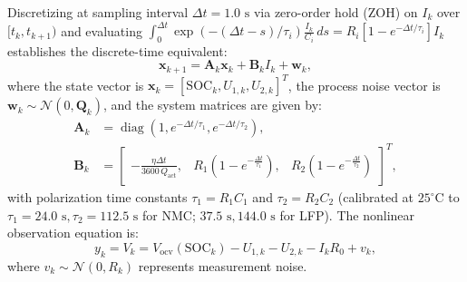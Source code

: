 \documentclass[balance,nocopyright,upint,varvw,hyphenate,barcolor=NavyBlue,nolists]{asmejour}
\begin{document}
Discretizing at sampling interval $\Delta t = 1.0\text{ s}$ via zero-order hold (ZOH) on $I_k$ over $[t_k, t_{k+1})$ and evaluating $\int_0^{\Delta t} \exp(-(\Delta t - s)/\tau_i) \frac{I_k}{C_i}\,ds = R_i [1 - e^{-\Delta t/\tau_i}] I_k$ establishes the discrete-time equivalent:
\begin{equation}\label{eqn:state_space_discrete}
\mathbf{x}_{k+1} = \mathbf{A}_k \mathbf{x}_k + \mathbf{B}_k I_k + \mathbf{w}_k,
\end{equation}
where the state vector is $\mathbf{x}_k = [\text{SOC}_k, U_{1,k}, U_{2,k}]^T$, the process noise vector is $\mathbf{w}_k \sim \mathcal{N}(0, \mathbf{Q}_k)$, and the system matrices are given by:
\begin{align}
\mathbf{A}_k &= \operatorname{diag}\left(1, e^{-\Delta t/\tau_1}, e^{-\Delta t/\tau_2}\right), \label{eqn:Ak_mat} \\
\mathbf{B}_k &= \begin{bmatrix}
-\frac{\eta \Delta t}{3600\,Q_{\text{act}}}, & R_1\left(1 - e^{-\frac{\Delta t}{\tau_1}}\right), & R_2\left(1 - e^{-\frac{\Delta t}{\tau_2}}\right)
\end{bmatrix}^T, \label{eqn:Bk_mat}
\end{align}
with polarization time constants $\tau_1 = R_1 C_1$ and $\tau_2 = R_2 C_2$ (calibrated at $25^\circ\text{C}$ to $\tau_1 = 24.0\text{ s}, \tau_2 = 112.5\text{ s}$ for NMC; $37.5\text{ s}, 144.0\text{ s}$ for LFP). The nonlinear observation equation is:
\begin{equation}\label{eqn:measurement_eq}
y_k = V_k = V_{\text{ocv}}(\text{SOC}_k) - U_{1,k} - U_{2,k} - I_k R_0 + v_k,
\end{equation}
where $v_k \sim \mathcal{N}(0, R_k)$ represents measurement noise.
\end{document}
